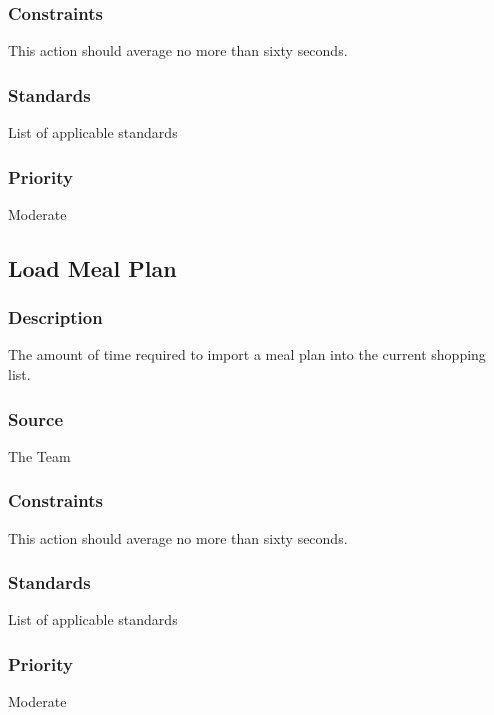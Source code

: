 \subsubsection{Constraints}
This action should average no more than sixty seconds.
\subsubsection{Standards}
List of applicable standards
\subsubsection{Priority}
Moderate

\subsection{Load Meal Plan}
\subsubsection{Description}
The amount of time required to import a meal plan into the current shopping list.
\subsubsection{Source}
The Team
\subsubsection{Constraints}
This action should average no more than sixty seconds.
\subsubsection{Standards}
List of applicable standards
\subsubsection{Priority}
Moderate